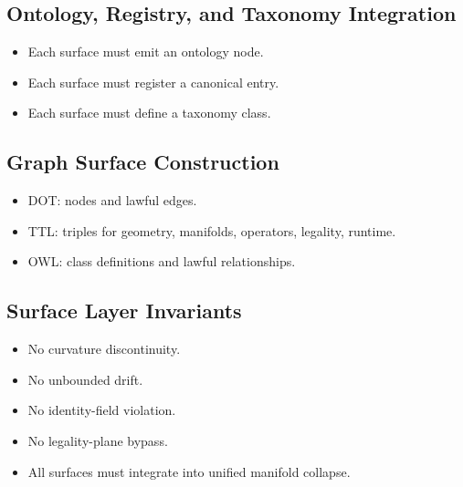 \subsection{Ontology, Registry, and Taxonomy Integration}
\begin{itemize}
    \item Each surface must emit an ontology node.
    \item Each surface must register a canonical entry.
    \item Each surface must define a taxonomy class.
\end{itemize}

\subsection{Graph Surface Construction}
\begin{itemize}
    \item DOT: nodes and lawful edges.
    \item TTL: triples for geometry, manifolds, operators, legality, runtime.
    \item OWL: class definitions and lawful relationships.
\end{itemize}

\subsection{Surface Layer Invariants}
\begin{itemize}
    \item No curvature discontinuity.
    \item No unbounded drift.
    \item No identity-field violation.
    \item No legality-plane bypass.
    \item All surfaces must integrate into unified manifold collapse.
\end{itemize}
